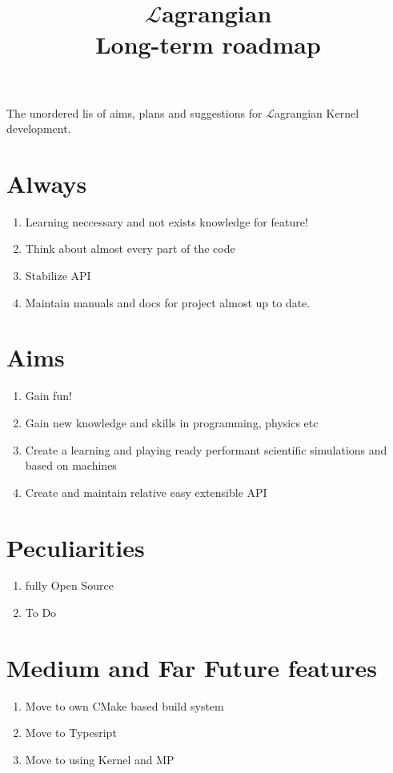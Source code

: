 \documentclass[12pt]{article}
\title{$\mathcal{L}$agrangian \\ Long-term roadmap}
\begin{document}
	\maketitle

	The unordered lis of aims, plans and suggestions for $\mathcal{L}$agrangian Kernel development.

	\section{Always}
	\begin{enumerate}
		\item Learning neccessary and not exists knowledge for feature!
		\item Think about almost every part of the code
		\item Stabilize API
		\item Maintain manuals and docs for project almost up to date.
	\end{enumerate}

	\section{Aims}
	\begin{enumerate}
		\item Gain fun!
		\item Gain new knowledge and skills in programming, physics etc
		\item Create a learning and playing ready performant scientific simulations and based on machines
		\item Create and maintain relative easy extensible API
	\end{enumerate}

	\section{Peculiarities}


	\begin{enumerate}
	\item fully Open Source
	\item To Do
	\end{enumerate}

	\section{Medium and Far Future features}

	\begin{enumerate}
		\item Move to own CMake based build system
		\item Move to Typesript
		\item Move to using Kernel and MP
	\end{enumerate}
\end{document}

